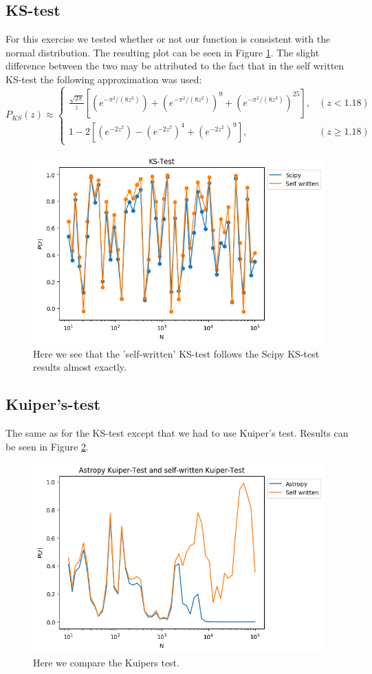 \documentclass[a4paper,10pt]{article}
\begin{document}
\subsection{KS-test}
For this exercise we tested whether or not our function is consistent with the normal distribution. The resulting plot can be seen in Figure \ref{fig:1e}. The slight difference between the two may be attributed to the fact that in the self written KS-test the following approximation was used: 
\[
	P_{KS}(z)\approx
\begin{cases}
	\frac{\sqrt{2\pi}}{z}[(e^{-\pi^2/(8z^2)})+(e^{-\pi^2/(8z^2)})^9+(e^{-\pi^2/(8z^2)})^25],& (z<1.18)\\
	1-2[(e^{-2z^2})-(e^{-2z^2})^4+(e^{-2z^2})^9],	& (z\geq 1.18)
\end{cases}
\]


\begin{figure}[h!]
  \centering
  \includegraphics[width=0.8\linewidth]{./plots/1e.png}
  \caption{Here we see that the 'self-written' KS-test follows the Scipy KS-test results almost exactly.}
  \label{fig:1e}
\end{figure}

\subsection{Kuiper's-test}

The same as for the KS-test except that we had to use Kuiper's test. Results can be seen in Figure \ref{fig:1f}.

\begin{figure}[h!]
  \centering
  \includegraphics[width=0.8\linewidth]{./plots/1f.png}
  \caption{Here we compare the Kuipers test.}
  \label{fig:1f}
\end{figure}
\end{document}
